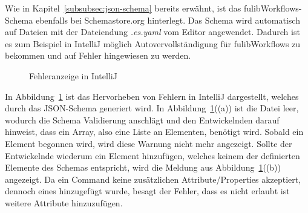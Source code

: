 Wie in Kapitel~\ref{subsubsec:json-schema} bereits erwähnt, ist das fulibWorkflows-Schema ebenfalls bei Schemastore.org hinterlegt.
Das Schema wird automatisch auf Dateien mit der Dateiendung \textit{.es.yaml} vom Editor angewendet.
Dadurch ist es zum Beispiel in IntelliJ möglich Autovervollständigung für fulibWorkflows zu bekommen und auf Fehler hingewiesen zu werden.

\begin{figure}[h]
    \centering
    \qquad
    \caption{Fehleranzeige in IntelliJ}
    \label{fig:errors-schema}
\end{figure}

In Abbildung~\ref{fig:errors-schema} ist das Hervorheben von Fehlern in IntelliJ dargestellt, welches durch das JSON-Schema generiert wird.
In Abbildung~\ref{fig:errors-schema}((a)) ist die Datei leer, wodurch die Schema Validierung anschlägt und den Entwickelnden darauf hinweist, dass ein Array, also eine Liste an Elementen, benötigt wird.
Sobald ein Element begonnen wird, wird diese Warnung nicht mehr angezeigt.
Sollte der Entwickelnde wiederum ein Element hinzufügen, welches keinem der definierten Elemente des Schemas entspricht, wird die Meldung aus Abbildung~\ref{fig:errors-schema}((b)) angezeigt.
Da ein Command keine zusätzlichen Attribute/Properties akzeptiert, dennoch eines hinzugefügt wurde, besagt der Fehler, dass es nicht erlaubt ist weitere Attribute hinzuzufügen.

